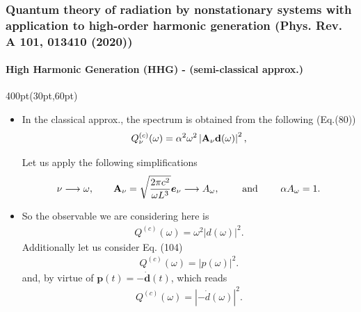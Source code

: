\begin{frame}
\frametitle{Quantum theory of radiation by nonstationary systems 
	with application to high-order harmonic generation
        (Phys. Rev. A 101, 013410 (2020))}
	\framesubtitle{High Harmonic Generation (HHG) - (semi-classical approx.)}

\begin{textblock*}{400pt}(30pt,60pt)
\footnotesize
\begin{itemize}
\item 	In the classical approx., the spectrum is obtained from the following 
(Eq.(80))
\begin{equation}
Q^{(c)}_\nu (\omega) = 
 \alpha^2 \omega^2
    \left| \boldsymbol{\rm A}_{\nu}\boldsymbol{\rm d}(\omega) \right|^2,
\label{eqn:Qc}
\end{equation}

	Let us apply the following simplifications
\begin{align}
    \nu \longrightarrow \omega, \hspace{20pt}
  \boldsymbol{\rm A}_\nu = \sqrt{\frac{2\pi c^2}{\omega L^3}}\boldsymbol{e}_\nu
\longrightarrow A_\omega, 
    \hspace{20pt}\mbox{ and } \hspace{20pt} \alpha A_\omega = 1.
\end{align}
\item So the observable we are considering here is 
\begin{align}
    Q^{(c)}(\omega) = \omega^2 \left| d(\omega)  \right|^2.
\label{eqn:dipole_form}
\end{align}
Additionally let us consider Eq. (104)
\begin{align}
    Q^{(c)}(\omega) = \left| p(\omega)  \right|^2.
\label{eqn:mom_form}
\end{align}
and, by virtue of $\boldsymbol{p}(t)= -\dot{\boldsymbol{d}}(t)$, which reads
\begin{align}
    Q^{(c)}(\omega) = \left| -\dot{d}(\omega)  \right|^2. 
\label{eqn:dipole_mom_form}
\end{align}

\end{itemize}
\end{textblock*}


\end{frame}








